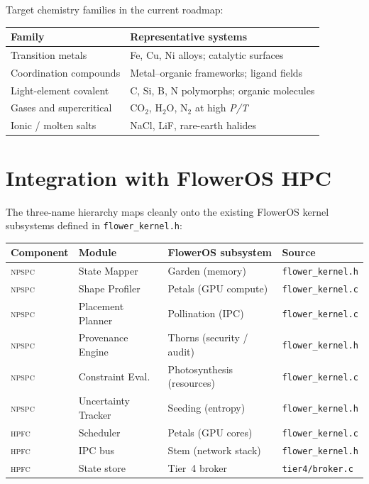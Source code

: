 \documentclass[11pt,a4paper]{article}
\theoremstyle{definition}
\theoremstyle{plain}
\newcommand{\NPSPC}{\textsc{npspc}}
\newcommand{\HPFC}{\textsc{hpfc}}
\begin{document}
\noindent
Target chemistry families in the current roadmap:
\begin{center}
\begin{tabular}{@{}ll@{}}
\toprule
\textbf{Family} & \textbf{Representative systems} \\
\midrule
Transition metals           & Fe, Cu, Ni alloys; catalytic surfaces \\
Coordination compounds      & Metal--organic frameworks; ligand fields \\
Light-element covalent      & C, Si, B, N polymorphs; organic molecules \\
Gases and supercritical     & CO$_2$, H$_2$O, N$_2$ at high \emph{P/T} \\
Ionic / molten salts        & NaCl, LiF, rare-earth halides \\
\bottomrule
\end{tabular}
\end{center}


\section{Integration with FlowerOS HPC}
\label{sec:floweros}

The three-name hierarchy maps cleanly onto the existing FlowerOS
kernel subsystems defined in \texttt{flower\_kernel.h}:

\begin{center}
\begin{tabular}{@{}llll@{}}
\toprule
\textbf{Component} & \textbf{Module} & \textbf{FlowerOS subsystem} &
  \textbf{Source} \\
\midrule
\NPSPC{} & State Mapper       & Garden (memory)            & \texttt{flower\_kernel.h} \\
\NPSPC{} & Shape Profiler     & Petals (GPU compute)       & \texttt{flower\_kernel.c} \\
\NPSPC{} & Placement Planner  & Pollination (IPC)          & \texttt{flower\_kernel.c} \\
\NPSPC{} & Provenance Engine  & Thorns (security / audit)  & \texttt{flower\_kernel.h} \\
\NPSPC{} & Constraint Eval.   & Photosynthesis (resources) & \texttt{flower\_kernel.c} \\
\NPSPC{} & Uncertainty Tracker& Seeding (entropy)          & \texttt{flower\_kernel.h} \\
\addlinespace
\HPFC{} & Scheduler          & Petals (GPU cores)         & \texttt{flower\_kernel.c} \\
\HPFC{} & IPC bus            & Stem (network stack)       & \texttt{flower\_kernel.h} \\
\HPFC{} & State store        & Tier~4 broker              & \texttt{tier4/broker.c}   \\
\bottomrule
\end{tabular}
\end{center}
\end{document}
